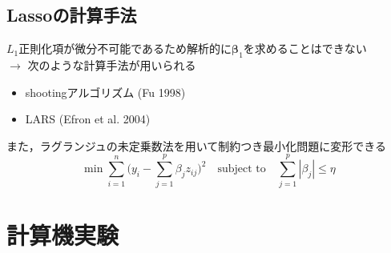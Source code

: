 \documentclass[dvipdfmx, 10pt]{beamer}
\begin{document}
\subsection{Lassoの計算手法}
\begin{frame}{\insertsubsection}
    $L_1$正則化項が微分不可能であるため解析的に$\bm{\beta}_1$を求めることはできない\\
    $\rightarrow$ 次のような計算手法が用いられる
    \begin{itemize}
	\item shootingアルゴリズム (Fu 1998)
	\item LARS (Efron et al. 2004)
    \end{itemize}
	\vspace{10pt}
	また，ラグランジュの未定乗数法を用いて制約つき最小化問題に変形できる
	\begin{equation}
        	\min \sum_{i=1}^{n}\bigl(
        		 y_i - \sum_{j=1}^{p} \beta_j z_{ij}
        	\bigr)^2 \quad
        	\text{subject to} \quad \sum_{j=1}^{p} |\beta_j| \leq \eta
        \end{equation}

\end{frame}

\section{計算機実験}
\end{document}
